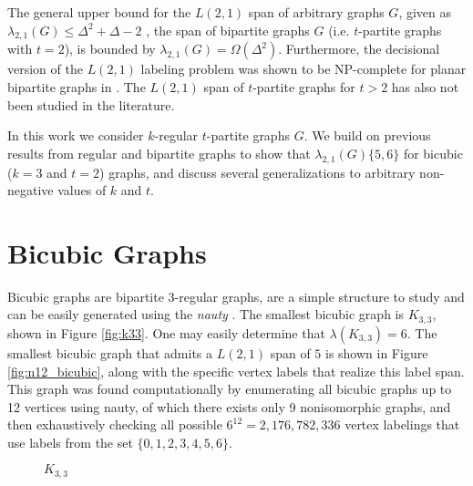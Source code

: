 \documentclass[12pt]{article}
\begin{document}
The general upper bound for the $L(2,1)$ span of arbitrary graphs $G$, given as $\lambda_{2,1}(G) \leq \Delta^2 + \Delta - 2$ \cite{81 - survey}, the span of bipartite graphs $G$ (i.e. $t$-partite graphs with $t = 2$), is bounded by $\lambda_{2,1}(G) = \Omega(\Delta^2)$. Furthermore, the decisional version of the $L(2,1)$ labeling problem was shown to be NP-complete for planar bipartite graphs in \cite{20 - survey}. The $L(2,1)$ span of $t$-partite graphs for $t > 2$ has also not been studied in the literature. 

In this work we consider $k$-regular $t$-partite graphs $G$. We build on previous results from regular and bipartite graphs to show that $\lambda_{2,1}(G) \{5,6\}$ for bicubic ($k = 3$ and $t = 2$) graphs, and discuss several generalizations to arbitrary non-negative values of $k$ and $t$. 

\section{Bicubic Graphs}
Bicubic graphs are bipartite 3-regular graphs, are a simple structure to study and can be easily generated using the \emph{nauty} \cite{nauty}. The smallest bicubic graph is $K_{3,3}$, shown in Figure \ref{fig:k33}. One may easily determine that $\lambda(K_{3,3}) = 6$. The smallest bicubic graph that admits a $L(2,1)$ span of $5$ is shown in Figure \ref{fig:n12_bicubic}, along with the specific vertex labels that realize this label span. This graph was found computationally by enumerating all bicubic graphs up to 12 vertices using nauty, of which there exists only 9 nonisomorphic graphs, and then exhaustively checking all possible $6^{12} = 2,176,782,336$ vertex labelings that use labels from the set $\{0,1,2,3,4,5,6\}$. 

\begin{figure}
\centering
{}
\caption{$K_{3,3}$}
\label{fig:d4n1}
\end{figure}
\end{document}
